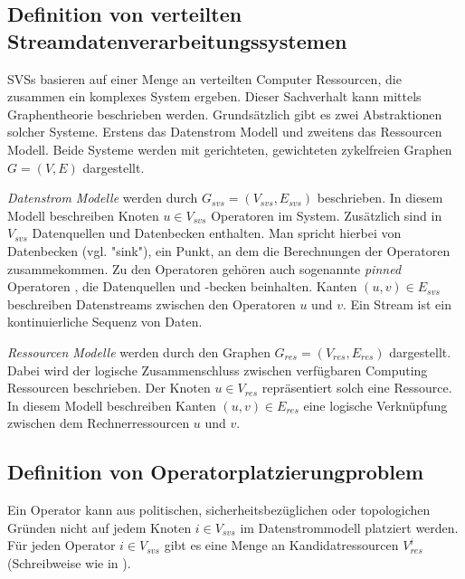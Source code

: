 \documentclass{article}
\begin{document}
\subsection{Definition von verteilten Streamdatenverarbeitungssystemen}  \label{SVS-Definition}  %
SVSs basieren auf einer Menge an verteilten Computer Ressourcen, die zusammen ein komplexes System ergeben. 
Dieser Sachverhalt kann mittels Graphentheorie beschrieben werden. Grundsätzlich gibt es zwei Abstraktionen solcher Systeme. 
Erstens das Datenstrom Modell und zweitens das Ressourcen Modell. 
Beide Systeme werden mit gerichteten, gewichteten zykelfreien Graphen $G = (V,E)$ dargestellt. 

\textit{Datenstrom Modelle} werden durch $G_{svs} = (V_{svs}, E_{svs})$ beschrieben. In diesem Modell beschreiben Knoten $u \in V_{svs}$ Operatoren im System. 
Zusätzlich sind in $V_{svs}$ Datenquellen und Datenbecken enthalten. Man spricht hierbei von Datenbecken (vgl. "sink"), ein Punkt, an dem die Berechnungen der Operatoren zusammekommen. 
Zu den Operatoren gehören auch sogenannte \textit{pinned} Operatoren \cite{k3}, 
die Datenquellen und -becken beinhalten. Kanten $(u,v) \in E_{svs}$ beschreiben Datenstreams 
zwischen den Operatoren $u$ und $v$.  Ein Stream ist ein kontinuierliche Sequenz von Daten. 

\textit{Ressourcen Modelle} werden durch den Graphen $G_{res} = (V_{res}, E_{res})$ dargestellt. 
Dabei wird der logische Zusammenschluss zwischen verfügbaren Computing Ressourcen beschrieben. Der Knoten $u \in V_{res}$ 
repräsentiert solch eine Ressource. In diesem Modell beschreiben Kanten $(u,v) \in E_{res}$ 
eine logische Verknüpfung zwischen dem Rechnerressourcen $u$ und $v$.


\subsection{Definition von Operatorplatzierungproblem} \label{OPP-Definition}
Ein Operator kann aus politischen, sicherheitsbezüglichen oder topologichen Gründen \cite{cardellini-optimal_operatorplc} nicht auf jedem Knoten 
$i \in V_{svs}$ im Datenstrommodell platziert werden. 
Für jeden Operator $i \in V_{svs}$ gibt es eine Menge an Kandidatressourcen $V_{res}^i$ (Schreibweise wie in \cite{k3}).
\end{document}
